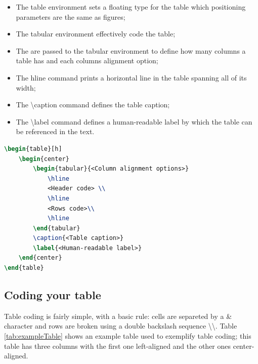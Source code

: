 \begin{itemize}
	\item The {\ttfamily table} environment sets a floating type for the table which positioning parameters are the same as figures;
	\item The {\ttfamily tabular} environment effectively code the table;
	\item The {\ttfamily <Column alignment options>} are passed to the tabular environment to define how many columns a table has and each columns alignment option;
	\item The {\ttfamily hline} command prints a horizontal line in the table spanning all of its width;
	\item The {\ttfamily \textbackslash caption} command defines the table caption;
	\item The {\ttfamily \textbackslash label} command defines a human-readable label by which the table can be referenced in the text.
\end{itemize}

\begin{lstlisting}[caption = {Basic table code}, label = {lst:basicTable}, style = prettyListing, language = tex]
\begin{table}[h]
	\begin{center}
		\begin{tabular}{<Column alignment options>}
			\hline
			<Header code> \\
			\hline
			<Rows code>\\
			\hline
		\end{tabular}
		\caption{<Table caption>}
		\label{<Human-readable label>}
	\end{center}
\end{table}
\end{lstlisting}

		\subsection{Coding your table}

	Table coding is fairly simple, with a basic rule: cells are separeted by a {\ttfamily \&} character and rows are broken using a double backslash sequence \textbackslash \textbackslash. Table \ref{tab:exampleTable} shows an example table used to exemplify table coding; this table has three columns with the first one left-aligned and the other ones center-aligned.

